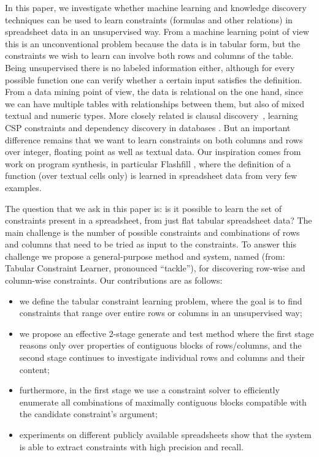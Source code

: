 In this paper,  we investigate whether machine learning and knowledge discovery techniques can be used to learn constraints (formulas and other relations) in spreadsheet data in an unsupervised way.
From a machine learning point of view this is an unconventional problem because the data is in tabular form, but the constraints we wish to learn can involve both rows and columns of the table. Being unsupervised there is no labeled information either, although for every possible function one can verify whether a certain input satisfies the definition.
From a data mining point of view, the data is relational on the one hand, since we can have multiple tables with relationships between them, but also of mixed textual and numeric types. More closely related is clausal discovery~\cite{claudien,lallouet}, learning CSP constraints \cite{Quacq,Conacq,modelseeker} and dependency discovery in databases \cite{savnik}. But an important difference remains that we want to learn constraints on both columns and rows over integer, floating point as well as textual data.
Our inspiration comes from work on program synthesis, in particular Flashfill \cite{flashfill}, where the definition of a function (over textual cells only) is learned in spreadsheet data from very few examples.


The question that we ask in this paper is: is it possible to learn the set of constraints present in a spreadsheet, from just flat tabular spreadsheet data? The main challenge is the number of possible constraints and combinations of rows and columns that need to be tried as input to the constraints.
To answer this challenge we propose a general-purpose method and system, named \sname (from: Tabular Constraint Learner, pronounced ``tackle''), for discovering row-wise and column-wise constraints.
%
Our contributions are as follows:
\begin{itemize}
\item we define the tabular constraint learning problem, where the goal is to find constraints that range over entire rows or columns in an unsupervised way;
\item we propose an effective 2-stage generate and test method where the first stage reasons only over properties of contiguous blocks of rows/columns, and the second stage continues to investigate individual rows and columns and their content;
\item furthermore, in the first stage we use a constraint solver to efficiently enumerate all combinations of maximally contiguous blocks compatible with the candidate constraint's argument; %
\item experiments on different publicly available spreadsheets show that the system is able to extract constraints with high precision and recall.
\end{itemize}

